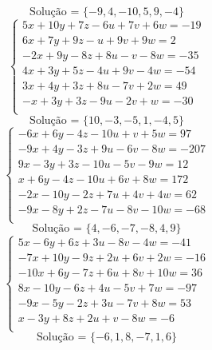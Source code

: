 \documentclass[12pt,oneside,a4paper]{article}
\begin{document}
\begin{equation*}
\text{Solução = }\{-9,4,-10,5,9,-4\}
\end{equation*}
\vspace{\baselineskip}
\begin{equation*}
\begin{cases}
5x+10y+7z-6u+7v+6w=-19 \\
6x+7y+9z-u+9v+9w=2 \\
-2x+9y-8z+8u-v-8w=-35 \\
4x+3y+5z-4u+9v-4w=-54 \\
3x+4y+3z+8u-7v+2w=49 \\
-x+3y+3z-9u-2v+w=-30 \\
\end{cases}
\end{equation*}
\begin{equation*}
\text{Solução = }\{10,-3,-5,1,-4,5\}
\end{equation*}
\vspace{\baselineskip}
\begin{equation*}
\begin{cases}
-6x+6y-4z-10u+v+5w=97 \\
-9x+4y-3z+9u-6v-8w=-207 \\
9x-3y+3z-10u-5v-9w=12 \\
x+6y-4z-10u+6v+8w=172 \\
-2x-10y-2z+7u+4v+4w=62 \\
-9x-8y+2z-7u-8v-10w=-68 \\
\end{cases}
\end{equation*}
\begin{equation*}
\text{Solução = }\{4,-6,-7,-8,4,9\}
\end{equation*}
\vspace{\baselineskip}
\begin{equation*}
\begin{cases}
5x-6y+6z+3u-8v-4w=-41 \\
-7x+10y-9z+2u+6v+2w=-16 \\
-10x+6y-7z+6u+8v+10w=36 \\
8x-10y-6z+4u-5v+7w=-97 \\
-9x-5y-2z+3u-7v+8w=53 \\
x-3y+8z+2u+v-8w=-6 \\
\end{cases}
\end{equation*}
\begin{equation*}
\text{Solução = }\{-6,1,8,-7,1,6\}
\end{equation*}
\end{document}
